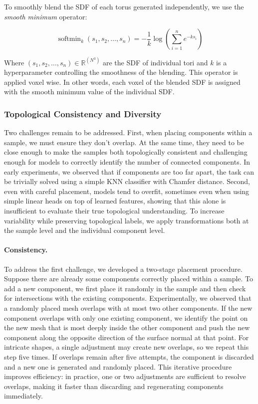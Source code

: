 To smoothly blend the SDF of each torus generated independently, we use the \textit{smooth minimum} operator:

\begin{equation}
\operatorname{softmin}_k(s_1, s_2, \dots, s_n) 
= -\frac{1}{k} \log \left( \sum_{i=1}^n e^{-k s_i} \right)
\end{equation}

Where $(s_1, s_2, \dots, s_n) \in \mathbb{R}^{(N^3)}$ are the SDF of individual tori and $k$ is a hyperparameter controlling the smoothness of the blending. This operator is applied voxel wise. In other words, each voxel of the blended SDF is assigned with the smooth minimum value of the individual SDF.

\subsubsection{Topological Consistency and Diversity}
\label{sssec:top-consistency}

Two challenges remain to be addressed. First, when placing components within a sample, we must ensure they don't overlap. At the same time, they need to be close enough to make the samples both topologically consistent and challenging enough for models to correctly identify the number of connected components. In early experiments, we observed that if components are too far apart, the task can be trivially solved using a simple KNN classifier with Chamfer distance. Second, even with careful placement, models tend to overfit, sometimes even when using simple linear heads on top of learned features, showing that this alone is insufficient to evaluate their true topological understanding. To increase variability while preserving topological labels, we apply transformations both at the sample level and the individual component level.

\paragraph{Consistency.} 
To address the first challenge, we developed a two-stage placement procedure. Suppose there are already some components correctly placed within a sample. To add a new component, we first place it randomly in the sample and then check for intersections with the existing components. Experimentally, we observed that a randomly placed mesh overlaps with at most two other components. If the new component overlaps with only one existing component, we identify the point on the new mesh that is most deeply inside the other component and push the new component along the opposite direction of the surface normal at that point. For intricate shapes, a single adjustment may create new overlaps, so we repeat this step five times. If overlaps remain after five attempts, the component is discarded and a new one is generated and randomly placed. This iterative procedure improves efficiency: in practice, one or two adjustments are sufficient to resolve overlaps, making it faster than discarding and regenerating components immediately.

